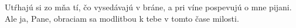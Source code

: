 Utŕhajú si zo mňa tí, čo vysedávajú v bráne,
a pri víne pospevujú o mne pijani.
Ale ja, Pane, obraciam sa modlitbou k tebe
v tomto čase milosti.